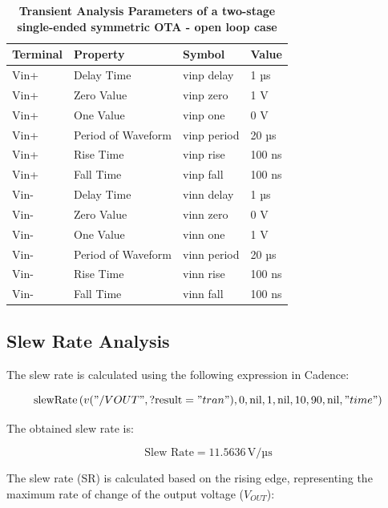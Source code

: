 \begin{table}[h]
    \centering
    \captionsetup{justification=centering} %
    \caption*{\textbf{Transient Analysis Parameters of a two-stage single-ended symmetric OTA  - open loop case}} %
    \begin{tabular}{l l l l}
        \toprule
        Terminal & Property & Symbol & Value \\
        \midrule
        Vin+ & Delay Time & vinp delay & 1 µs \\
        Vin+ & Zero Value & vinp zero & 1 V \\
        Vin+ & One Value & vinp one & 0 V \\
        Vin+ & Period of Waveform & vinp period & 20 µs \\
        Vin+ & Rise Time & vinp rise & 100 ns \\
        Vin+ & Fall Time & vinp fall & 100 ns \\
        Vin- & Delay Time & vinn delay & 1 µs \\
        Vin- & Zero Value & vinn zero & 0 V \\
        Vin- & One Value & vinn one & 1 V \\
        Vin- & Period of Waveform & vinn period & 20 µs \\
        Vin- & Rise Time & vinn rise & 100 ns \\
        Vin- & Fall Time & vinn fall & 100 ns \\
        \bottomrule
    \end{tabular}
    \label{tab:transient_analysis}
\end{table}


\subsection{Slew Rate Analysis}
The slew rate is calculated using the following expression in Cadence:


\begin{equation}
\text{slewRate} \left( v("/VOUT", \text{?result} = "tran"), 0, \text{nil}, 1, \text{nil}, 10, 90, \text{nil}, "time" \right)
\end{equation}

The obtained slew rate is:

\begin{equation}
\text{Slew Rate} = 11.5636\, \text{V/µs}
\end{equation}

The slew rate (SR) is calculated based on the rising edge, representing the maximum rate of change of the output voltage ($V_{OUT}$):


